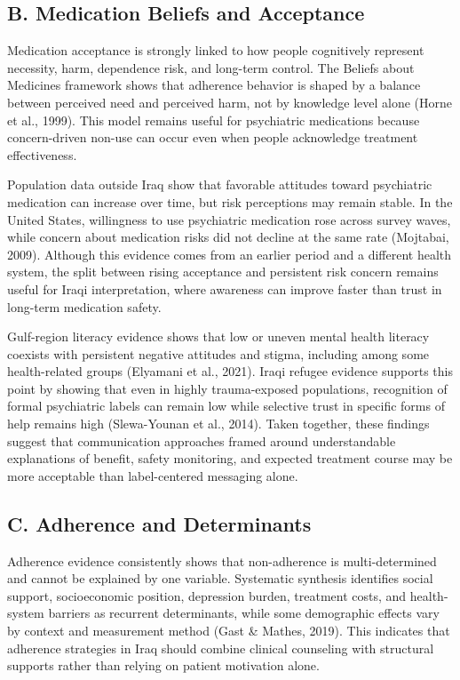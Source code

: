 \subsection{B. Medication Beliefs and
Acceptance}\label{b.-medication-beliefs-and-acceptance}

Medication acceptance is strongly linked to how people cognitively
represent necessity, harm, dependence risk, and long-term control. The
Beliefs about Medicines framework shows that adherence behavior is
shaped by a balance between perceived need and perceived harm, not by
knowledge level alone (Horne et al., 1999). This model remains useful
for psychiatric medications because concern-driven non-use can occur
even when people acknowledge treatment effectiveness.

Population data outside Iraq show that favorable attitudes toward
psychiatric medication can increase over time, but risk perceptions may
remain stable. In the United States, willingness to use psychiatric
medication rose across survey waves, while concern about medication
risks did not decline at the same rate (Mojtabai, 2009). Although this
evidence comes from an earlier period and a different health system, the
split between rising acceptance and persistent risk concern remains
useful for Iraqi interpretation, where awareness can improve faster than
trust in long-term medication safety.

Gulf-region literacy evidence shows that low or uneven mental health
literacy coexists with persistent negative attitudes and stigma,
including among some health-related groups (Elyamani et al., 2021).
Iraqi refugee evidence supports this point by showing that even in
highly trauma-exposed populations, recognition of formal psychiatric
labels can remain low while selective trust in specific forms of help
remains high (Slewa-Younan et al., 2014). Taken together, these findings
suggest that communication approaches framed around understandable
explanations of benefit, safety monitoring, and expected treatment
course may be more acceptable than label-centered messaging alone.

\subsection{C. Adherence and
Determinants}\label{c.-adherence-and-determinants}

Adherence evidence consistently shows that non-adherence is
multi-determined and cannot be explained by one variable. Systematic
synthesis identifies social support, socioeconomic position, depression
burden, treatment costs, and health-system barriers as recurrent
determinants, while some demographic effects vary by context and
measurement method (Gast \& Mathes, 2019). This indicates that adherence
strategies in Iraq should combine clinical counseling with structural
supports rather than relying on patient motivation alone.


